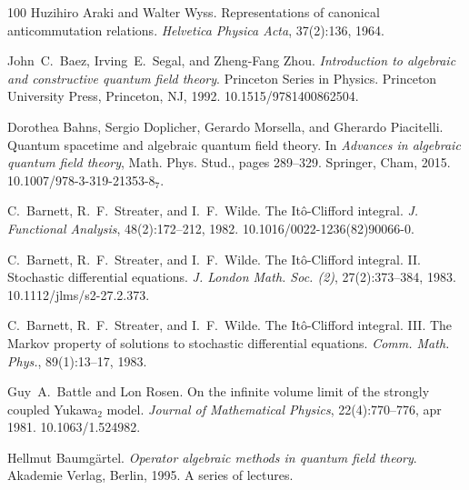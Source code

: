 \documentclass{article}
\newcommand{\tmrsub}[1]{\ensuremath{_{\textrm{#1}}}}
\newcommand{\tmtextit}[1]{{\itshape{#1}}}
\begin{document}
\begin{thebibliography}{100}
  Huzihiro Araki  and  Walter Wyss.
  {\newblock}Representations of canonical anticommutation relations.
  {\newblock}\tmtextit{Helvetica Physica Acta}, 37(2):136, 1964.{\newblock}
  
  John~C.~Baez, Irving~E.~Segal, and  Zheng-Fang Zhou.
  {\newblock}\tmtextit{Introduction to algebraic and constructive quantum
  field theory}. {\newblock}Princeton Series in Physics. Princeton University
  Press, Princeton, NJ, 1992.
  {\newblock}\href{Https://doi.org/10.1515/9781400862504}{}10.1515/9781400862504.{\newblock}
  
  Dorothea Bahns, Sergio Doplicher, Gerardo Morsella,
  and  Gherardo Piacitelli. {\newblock}Quantum spacetime and algebraic quantum
  field theory. {\newblock}In \tmtextit{Advances in algebraic quantum field
  theory}, Math. Phys. Stud.,  pages  289--329. Springer, Cham, 2015.
  {\newblock}\href{Https://doi.org/10.1007/978-3-319-21353-8_7}{}10.1007/978-3-319-21353-8\tmrsub{7}.{\newblock}
  
  C.~Barnett, R.~F.~Streater, and  I.~F.~Wilde.
  {\newblock}The It{\^o}-Clifford integral. {\newblock}\tmtextit{J. Functional
  Analysis}, 48(2):172--212, 1982.
  {\newblock}\href{Https://doi.org/10.1016/0022-1236(82)90066-0}{}10.1016/0022-1236(82)90066-0.{\newblock}
  
  C.~Barnett, R.~F.~Streater, and  I.~F.~Wilde.
  {\newblock}The It{\^o}-Clifford integral. II. Stochastic differential
  equations. {\newblock}\tmtextit{J. London Math. Soc. (2)}, 27(2):373--384,
  1983.
  {\newblock}\href{Https://doi.org/10.1112/jlms/s2-27.2.373}{}10.1112/jlms/s2-27.2.373.{\newblock}
  
  C.~Barnett, R.~F.~Streater, and  I.~F.~Wilde.
  {\newblock}The It{\^o}-Clifford integral. III. The Markov property of
  solutions to stochastic differential equations. {\newblock}\tmtextit{Comm.
  Math. Phys.}, 89(1):13--17, 1983.{\newblock}
  
  Guy~A.~Battle  and  Lon Rosen.
  {\newblock}On the infinite volume limit of the strongly coupled
  Yukawa\tmrsub{$2$} model. {\newblock}\tmtextit{Journal of Mathematical
  Physics}, 22(4):770--776, apr 1981.
  {\newblock}\href{Https://doi.org/10.1063/1.524982}{}10.1063/1.524982.{\newblock}
  
  Hellmut Baumg{\"a}rtel.
  {\newblock}\tmtextit{Operator algebraic methods in quantum field theory}.
  {\newblock}Akademie Verlag, Berlin, 1995. {\newblock}A series of
  lectures.{\newblock}
  

\end{thebibliography}
\end{document}
